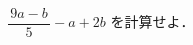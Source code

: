 \documentclass[../../../../hsm_tok_q.tex]{subfiles}
\begin{document}
    $\dfrac{\,9a-b\,}{5} - a + 2b$ を計算せよ．
\end{document}

